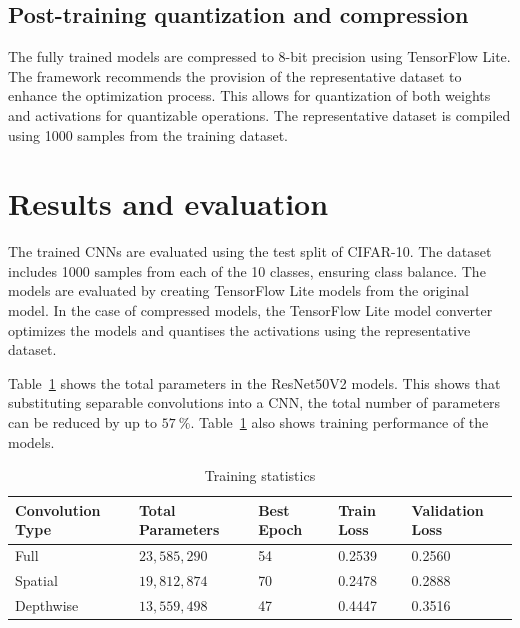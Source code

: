 \documentclass{article}
\begin{document}
	\subsection{Post-training quantization and compression}
	The fully trained models are compressed to 8-bit precision using TensorFlow Lite. The framework recommends the provision of the representative dataset to enhance the optimization process. This allows for quantization of both weights and activations for quantizable operations. The representative dataset is compiled using 1000 samples from the training dataset. 	
	
	
	\section{Results and evaluation}
	\label{sec:results}
	
	The trained CNNs are evaluated using the test split of CIFAR-10. The dataset includes 1000 samples from each of the 10 classes, ensuring class balance. The models are evaluated by creating TensorFlow Lite models from the original model. In the case of compressed models, the TensorFlow Lite model converter optimizes the models and quantises the activations using the representative dataset. 
	
	Table~\ref{tbl:params} shows the total parameters in the ResNet50V2 models. This shows that substituting separable convolutions into a CNN, the total number of parameters can be reduced by up to $57~\%$. Table~\ref{tbl:params} also shows training performance of the models.
	
	\begin{table}[b!]
		\caption{Training statistics}
		\label{tbl:params}
		\centering
		\begin{tabular}{lllll}
			\toprule
			Convolution Type & Total Parameters & Best Epoch & Train Loss & Validation Loss \\ \midrule
			Full             & $23,585,290$     & 54         & 0.2539     & 0.2560          \\
			Spatial          & $19,812,874$     & 70         & 0.2478     & 0.2888          \\
			Depthwise        & $13,559,498$     & 47         & 0.4447     & 0.3516          \\ \bottomrule
		\end{tabular}
	\end{table}
	
\end{document}
